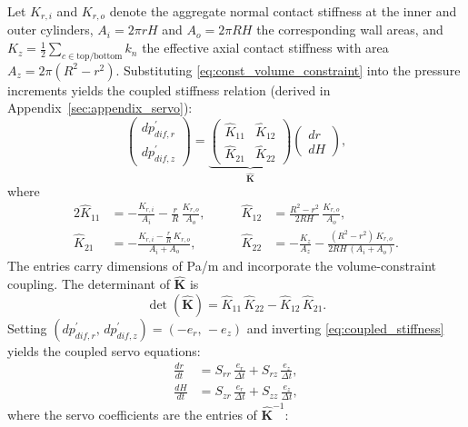 Let $K_{r,i}$ and $K_{r,o}$ denote the aggregate normal contact stiffness at the inner and outer cylinders, $A_i=2\pi rH$ and $A_o=2\pi RH$ the corresponding wall areas, and $K_z=\frac{1}{2}\sum_{c\in\mathrm{top/bottom}} k_n$ the effective axial contact stiffness with area $A_z=2\pi(R^2-r^2)$. Substituting \cref{eq:const_volume_constraint} into the pressure increments yields the coupled stiffness relation (derived in Appendix~\ref{sec:appendix_servo}):
\begin{equation}
\begin{pmatrix} dp_{dif,r}^{\prime} \\[4pt] dp_{dif,z}^{\prime} \end{pmatrix}
=
\underbrace{\begin{pmatrix} \hat{K}_{11} & \hat{K}_{12} \\[6pt] \hat{K}_{21} & \hat{K}_{22} \end{pmatrix}}_{\hat{\mathbf{K}}}
\begin{pmatrix} dr \\[4pt] dH \end{pmatrix},
\label{eq:coupled_stiffness}
\end{equation}
where
\begin{alignat}{2}
\hat{K}_{11} &= -\frac{K_{r,i}}{A_i}-\frac{r}{R}\,\frac{K_{r,o}}{A_o}, &\qquad
\hat{K}_{12} &= \frac{R^2-r^2}{2RH}\,\frac{K_{r,o}}{A_o}, \label{eq:Khat_main_row1}\\[4pt]
\hat{K}_{21} &= -\frac{K_{r,i}-\frac{r}{R}\,K_{r,o}}{A_i+A_o}, &\qquad
\hat{K}_{22} &= -\frac{K_z}{A_z}-\frac{(R^2-r^2)\,K_{r,o}}{2RH\,(A_i+A_o)}. \label{eq:Khat_main_row2}
\end{alignat}
The entries carry dimensions of Pa/m and incorporate the volume-constraint coupling. The determinant of $\hat{\mathbf{K}}$ is
\begin{equation}
\det(\hat{\mathbf{K}}) = \hat{K}_{11}\,\hat{K}_{22} - \hat{K}_{12}\,\hat{K}_{21}.
\label{eq:det_K_main}
\end{equation}
Setting $(dp_{dif,r}^{\prime},\,dp_{dif,z}^{\prime})=(-e_r,\,-e_z)$ and inverting \cref{eq:coupled_stiffness} yields the coupled servo equations:
\begin{align}
\frac{dr}{dt} &= S_{rr}\,\frac{e_r}{\Delta t} + S_{rz}\,\frac{e_z}{\Delta t}, \label{eq:servo_dr}\\[6pt]
\frac{dH}{dt} &= S_{zr}\,\frac{e_r}{\Delta t} + S_{zz}\,\frac{e_z}{\Delta t}, \label{eq:servo_dH}
\end{align}
where the servo coefficients are the entries of $\hat{\mathbf{K}}^{-1}$:
